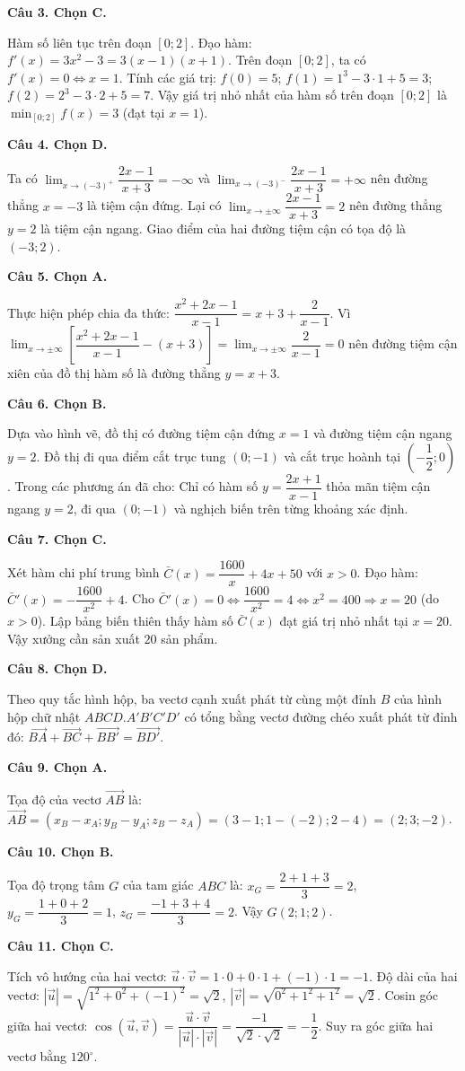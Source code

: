 \documentclass[12pt,a4paper]{article}
\newcommand{\loigiai}[1]{\par\medskip\Needspace{4\baselineskip}\noindent\textbf{#1}\par\nobreak}
\begin{document}
\loigiai{Câu 3. Chọn C.}
Hàm số liên tục trên đoạn $[0;2]$. Đạo hàm: $f'(x)=3x^2-3=3(x-1)(x+1)$.
Trên đoạn $[0;2]$, ta có $f'(x)=0\Leftrightarrow x=1$.
Tính các giá trị:
$f(0)=5$; $f(1)=1^3-3\cdot 1+5=3$; $f(2)=2^3-3\cdot 2+5=7$.
Vậy giá trị nhỏ nhất của hàm số trên đoạn $[0;2]$ là $\min_{[0;2]}f(x)=3$ (đạt tại $x=1$).

\loigiai{Câu 4. Chọn D.}
Ta có $\lim_{x\to (-3)^+}\dfrac{2x-1}{x+3}=-\infty$ và $\lim_{x\to (-3)^-}\dfrac{2x-1}{x+3}=+\infty$ nên đường thẳng $x=-3$ là tiệm cận đứng.
Lại có $\lim_{x\to\pm\infty}\dfrac{2x-1}{x+3}=2$ nên đường thẳng $y=2$ là tiệm cận ngang.
Giao điểm của hai đường tiệm cận có tọa độ là $(-3;2)$.

\loigiai{Câu 5. Chọn A.}
Thực hiện phép chia đa thức: $\dfrac{x^2+2x-1}{x-1}=x+3+\dfrac{2}{x-1}$.
Vì $\lim_{x\to\pm\infty}\left[\dfrac{x^2+2x-1}{x-1}-(x+3)\right]=\lim_{x\to\pm\infty}\dfrac{2}{x-1}=0$ nên đường tiệm cận xiên của đồ thị hàm số là đường thẳng $y=x+3$.

\loigiai{Câu 6. Chọn B.}
Dựa vào hình vẽ, đồ thị có đường tiệm cận đứng $x=1$ và đường tiệm cận ngang $y=2$.
Đồ thị đi qua điểm cắt trục tung $(0;-1)$ và cắt trục hoành tại $\left(-\dfrac{1}{2};0\right)$.
Trong các phương án đã cho:
Chỉ có hàm số $y=\dfrac{2x+1}{x-1}$ thỏa mãn tiệm cận ngang $y=2$, đi qua $(0;-1)$ và nghịch biến trên từng khoảng xác định.

\loigiai{Câu 7. Chọn C.}
Xét hàm chi phí trung bình $\bar{C}(x)=\dfrac{1600}{x}+4x+50$ với $x>0$.
Đạo hàm: $\bar{C}'(x)=-\dfrac{1600}{x^2}+4$.
Cho $\bar{C}'(x)=0\Leftrightarrow \dfrac{1600}{x^2}=4\Leftrightarrow x^2=400\Rightarrow x=20$ (do $x>0$).
Lập bảng biến thiên thấy hàm số $\bar{C}(x)$ đạt giá trị nhỏ nhất tại $x=20$.
Vậy xưởng cần sản xuất $20$ sản phẩm.

\loigiai{Câu 8. Chọn D.}
Theo quy tắc hình hộp, ba vectơ cạnh xuất phát từ cùng một đỉnh $B$ của hình hộp chữ nhật $ABCD.A'B'C'D'$ có tổng bằng vectơ đường chéo xuất phát từ đỉnh đó: $\vec{BA}+\vec{BC}+\vec{BB'}=\vec{BD'}$.

\loigiai{Câu 9. Chọn A.}
Tọa độ của vectơ $\vec{AB}$ là:
$\vec{AB}=(x_B-x_A;y_B-y_A;z_B-z_A)=(3-1;1-(-2);2-4)=(2;3;-2)$.

\loigiai{Câu 10. Chọn B.}
Tọa độ trọng tâm $G$ của tam giác $ABC$ là:
$x_G=\dfrac{2+1+3}{3}=2$, $y_G=\dfrac{1+0+2}{3}=1$, $z_G=\dfrac{-1+3+4}{3}=2$.
Vậy $G(2;1;2)$.

\loigiai{Câu 11. Chọn C.}
Tích vô hướng của hai vectơ:
$\vec{u}\cdot\vec{v}=1\cdot 0+0\cdot 1+(-1)\cdot 1=-1$.
Độ dài của hai vectơ:
$|\vec{u}|=\sqrt{1^2+0^2+(-1)^2}=\sqrt{2}$, $|\vec{v}|=\sqrt{0^2+1^2+1^2}=\sqrt{2}$.
Cosin góc giữa hai vectơ:
$\cos(\vec{u},\vec{v})=\dfrac{\vec{u}\cdot\vec{v}}{|\vec{u}|\cdot|\vec{v}|}=\dfrac{-1}{\sqrt{2}\cdot\sqrt{2}}=-\dfrac{1}{2}$.
Suy ra góc giữa hai vectơ bằng $120^\circ$.
\end{document}
